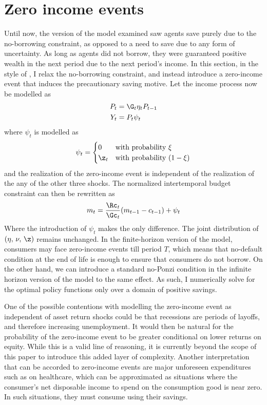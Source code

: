\section{Zero income events}\label{zero_inc}

Until now, the version of the model examined saw agents save purely due to the no-borrowing constraint, as opposed to a need to save due to any form of uncertainty. As long as agents did not borrow, they were guaranteed positive wealth in the next period due to the next period's income. In this section, in the style of \citet{Carroll1997}, I relax the no-borrowing constraint, and instead introduce a zero-income event that induces the precautionary saving motive. Let the income process now be modelled as
\begin{align*}
    P_{t} &= \G_{t}\eta_{t}P_{t-1}\\
    Y_{t} &= P_{t}\psi_{t}
\end{align*}
where $\psi_{t}$ is modelled as
\[
\psi_{t} = \begin{cases}
    0 & \text{with probability } \xi\\
    \z_{t} & \text{with probability } (1-\xi)
\end{cases}
\]
and the realization of the zero-income event is independent of the realization of the any of the other three shocks. The normalized intertemporal budget constraint can then be rewritten as
\[
m_{t} = \frac{\Rc_{t}}{\Gc_{t}}(m_{t-1} - c_{t-1}) + \psi_{t}
\]
Where the introduction of $\psi_t$ makes the only difference. The joint distribution of $(\eta,\,\nu,\,\z)$ remains unchanged. In the finite-horizon version of the model, consumers may face zero-income events till period $T$, which means that no-default condition at the end of life is enough to ensure that consumers do not borrow. On the other hand, we can introduce a standard no-Ponzi condition in the infinite horizon version of the model to the same effect. As such, I numerically solve for the optimal policy functions only over a domain of positive savings.

One of the possible contentions with modelling the zero-income event as independent of asset return shocks could be that recessions are periods of layoffs, and therefore increasing unemployment. It would then be natural for the probability of the zero-income event to be greater conditional on lower returns on equity. While this is a valid line of reasoning, it is currently beyond the scope of this paper to introduce this added layer of complexity. Another interpretation that can be accorded to zero-income events are major unforeseen expenditures such as on healthcare, which can be approximated as situations where the consumer's net disposable income to spend on the consumption good is near zero. In such situations, they must consume using their savings.

